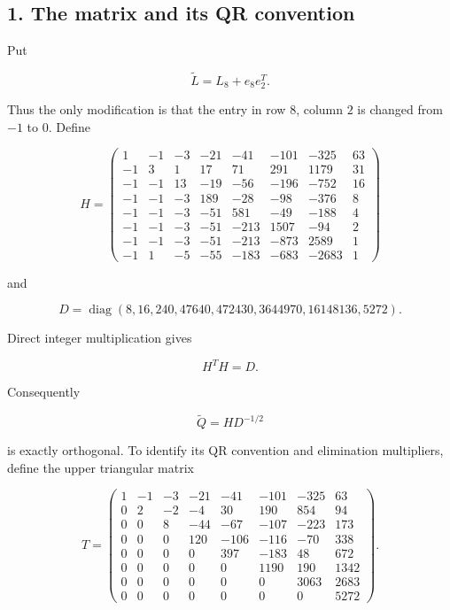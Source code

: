 \documentclass[10pt,a4paper]{article}
\begin{document}
\subsection{1. The matrix and its QR
convention}\label{the-matrix-and-its-qr-convention}

Put

\nopagebreak[4]

\[
\widetilde L=L_8+e_8e_2^T.
\]

Thus the only modification is that the entry in row \(8\), column \(2\)
is changed from \(-1\) to \(0\). Define

\nopagebreak[4]

\[
H=
\begin{pmatrix}
 1&-1&-3&-21&-41&-101&-325&63\\
-1& 3& 1& 17& 71& 291&1179&31\\
-1&-1&13&-19&-56&-196&-752&16\\
-1&-1&-3&189&-28&-98&-376&8\\
-1&-1&-3&-51&581&-49&-188&4\\
-1&-1&-3&-51&-213&1507&-94&2\\
-1&-1&-3&-51&-213&-873&2589&1\\
-1& 1&-5&-55&-183&-683&-2683&1
\end{pmatrix}
\]

and

\nopagebreak[4]

\[
D=\operatorname{diag}(8,16,240,47640,472430,3644970,16148136,5272).
\]

Direct integer multiplication gives

\nopagebreak[4]

\[
H^TH=D.
\]

Consequently

\nopagebreak[4]

\[
\widetilde Q=HD^{-1/2}
\]

is exactly orthogonal. To identify its QR convention and elimination
multipliers, define the upper triangular matrix

\nopagebreak[4]

\[
T=
\begin{pmatrix}
1&-1&-3&-21&-41&-101&-325&63\\
0&2&-2&-4&30&190&854&94\\
0&0&8&-44&-67&-107&-223&173\\
0&0&0&120&-106&-116&-70&338\\
0&0&0&0&397&-183&48&672\\
0&0&0&0&0&1190&190&1342\\
0&0&0&0&0&0&3063&2683\\
0&0&0&0&0&0&0&5272
\end{pmatrix}.
\]
\end{document}
